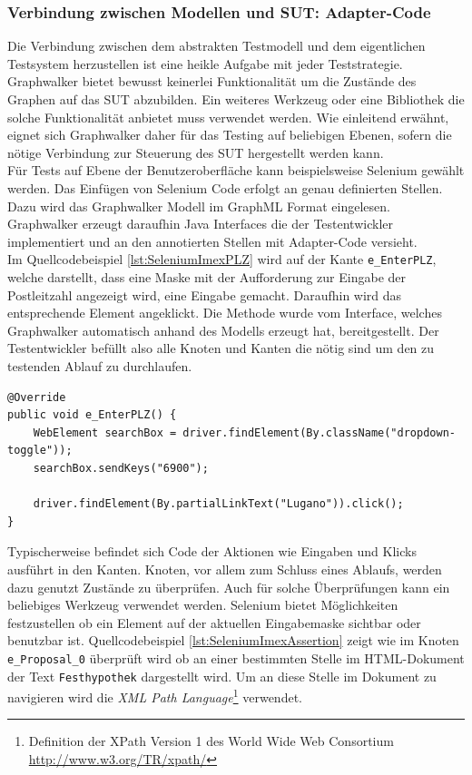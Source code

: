 \subsubsection{Verbindung zwischen Modellen und \Gls{SUT}: Adapter-Code}
Die Verbindung zwischen dem abstrakten Testmodell und dem eigentlichen Testsystem herzustellen ist eine heikle Aufgabe mit jeder Teststrategie. Graphwalker bietet bewusst keinerlei Funktionalität um die Zustände des Graphen auf das \Gls{SUT} abzubilden. Ein weiteres Werkzeug oder eine Bibliothek die solche Funktionalität anbietet muss verwendet werden. Wie einleitend erwähnt, eignet sich Graphwalker daher für das Testing auf beliebigen Ebenen, sofern die nötige Verbindung zur Steuerung des \Gls{SUT} hergestellt werden kann.\\
Für Tests auf Ebene der Benutzeroberfläche kann beispielsweise Selenium gewählt werden. Das Einfügen von Selenium Code erfolgt an genau definierten Stellen. Dazu wird das Graphwalker Modell im GraphML Format eingelesen. Graphwalker erzeugt daraufhin Java Interfaces die der Testentwickler implementiert und an den annotierten Stellen mit Adapter-Code versieht.\\ Im Quellcodebeispiel \ref{lst:SeleniumImexPLZ} wird auf der Kante \texttt{e\_EnterPLZ}, welche darstellt, dass eine Maske mit der Aufforderung zur Eingabe der Postleitzahl angezeigt wird, eine Eingabe gemacht. Daraufhin wird das entsprechende Element angeklickt. Die Methode wurde vom Interface, welches Graphwalker automatisch anhand des Modells erzeugt hat, bereitgestellt. Der Testentwickler befüllt also alle Knoten und Kanten die nötig sind um den zu testenden Ablauf zu durchlaufen. 

\begin{lstlisting}[caption={Auf einer Kante wird mittels Selenium eine Eingabe und ein Klick durchgeführt.}, label=lst:SeleniumImexPLZ]
@Override
public void e_EnterPLZ() {
    WebElement searchBox = driver.findElement(By.className("dropdown-toggle"));
    searchBox.sendKeys("6900");

    driver.findElement(By.partialLinkText("Lugano")).click();
}
\end{lstlisting}

Typischerweise befindet sich Code der Aktionen wie Eingaben und Klicks ausführt in den Kanten. Knoten, vor allem zum Schluss eines Ablaufs, werden dazu genutzt Zustände zu überprüfen. Auch für solche Überprüfungen kann ein beliebiges Werkzeug verwendet werden. Selenium bietet Möglichkeiten festzustellen ob ein Element auf der aktuellen Eingabemaske sichtbar oder benutzbar ist. Quellcodebeispiel \ref{lst:SeleniumImexAssertion} zeigt wie im Knoten \texttt{e\_Proposal\_0} überprüft wird ob an einer bestimmten Stelle im HTML-Dokument der Text \texttt{Festhypothek} dargestellt wird. Um an diese Stelle im Dokument zu navigieren wird die \textit{XML Path Language}\footnote{Definition der XPath Version 1 des World Wide Web Consortium \url{http://www.w3.org/TR/xpath/}} verwendet.

